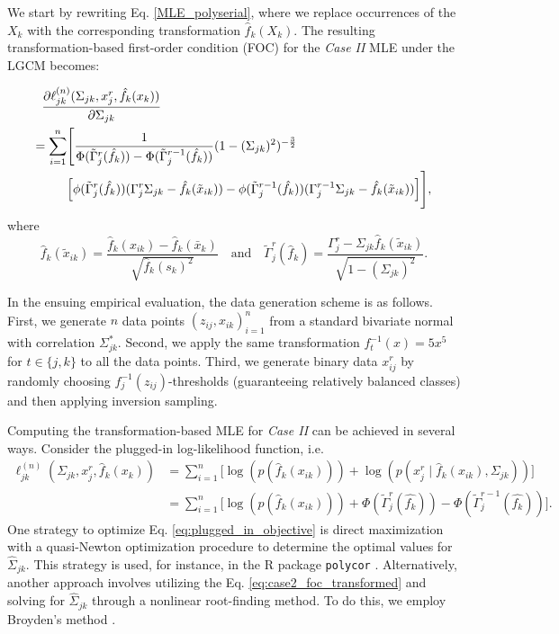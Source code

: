 We start by rewriting Eq. \eqref{MLE_polyserial}, where we replace occurrences of the $X_k$ with the corresponding transformation $\hat{f}_k(X_k)$. The resulting transformation-based first-order condition (FOC) for the \textit{Case II} MLE under the LGCM becomes:

\begin{align}\label{eq:case2_foc_transformed}
    \MoveEqLeft \frac{\partial\ell_{jk}^{(n)}(\Sigma_{jk}, x_j^r,\hat{f_k}(x_k))}{\partial \Sigma_{jk}}                                                                                                                                 \\
    = \sum_{i=1}^n & \Bigg[\frac{1}{\Phi(\tilde{\Gamma}_j^{r}(\hat{f_k})) - \Phi(\tilde{\Gamma}_j^{r-1}(\hat{f_k}))}(1-(\Sigma_{jk})^2)^{-\frac{3}{2}}                                                                                  \\
                   & \Big[\phi({\tilde{\Gamma}}_j^{r}(\hat{f_k}))({\Gamma}_j^r\Sigma_{jk} - \hat{f_k}(\tilde{x}_{ik})) - \phi({\tilde{\Gamma}}_j^{r-1}(\hat{f_k}))({\Gamma}_j^{r-1}\Sigma_{jk} - \hat{f_k}(\tilde{x}_{ik}))\Big]\Bigg],
\end{align}
where
\[\hat{f}_k(\tilde{x}_{ik}) = \frac{\hat{f}_k(x_{ik}) - \hat{f}_k(\bar{x}_k)}{\sqrt{\hat{f}_k(s_k)^2}} \quad \text{and} \quad {\tilde{\Gamma}}_j^{r}(\hat{f}_k) = \frac{{\Gamma}_j^{r} - \Sigma_{jk}\hat{f}_k(\tilde{x}_{ik})}{\sqrt{1-(\Sigma_{jk})^2}}.\]

In the ensuing empirical evaluation, the data generation scheme is as follows. First, we generate \(n\) data points \((z_{ij}, x_{ik})_{i=1}^n\) from a standard bivariate normal with correlation \(\Sigma^*_{jk}\). Second, we apply the same transformation \(f_t^{-1}(x) = 5x^5\) for \(t \in \{j,k\}\) to all the data points. Third, we generate binary data \(x_{ij}^r\) by randomly choosing \(f^{-1}_j(z_{ij})\)-thresholds (guaranteeing relatively balanced classes) and then applying inversion sampling.

Computing the transformation-based MLE for \textit{Case II} can be achieved in several ways. Consider the plugged-in log-likelihood function, i.e.
\begin{equation}\label{eq:plugged_in_objective}
    \begin{split}
        \ell_{jk}^{(n)}(\Sigma_{jk}, x_j^r,\hat{f}_k(x_k)) & = \sum_{i=1}^n \big[\log(p(\hat{f}_k(x_{ik}))) + \log(p(x_{j}^{r} \mid \hat{f}_k(x_{ik}), \Sigma_{jk}))\big]                      \\
        & = \sum_{i=1}^n \big[\log(p(\hat{f}_k(x_{ik}))) + \Phi(\tilde{\Gamma}_j^{r}(\hat{f_k})) - \Phi(\tilde{\Gamma}_j^{r-1}(\hat{f_k}))\big].
    \end{split}
\end{equation}
One strategy to optimize Eq. \eqref{eq:plugged_in_objective} is direct maximization with a quasi-Newton optimization procedure to determine the optimal values for $\hat\Sigma_{jk}$. This strategy is used, for instance, in the R package \texttt{polycor} \citep{polycor2022}. Alternatively, another approach involves utilizing the Eq. \eqref{eq:case2_foc_transformed} and solving for $\hat\Sigma_{jk}$ through a nonlinear root-finding method. To do this, we employ Broyden's method \citep{Broyden1965}.

